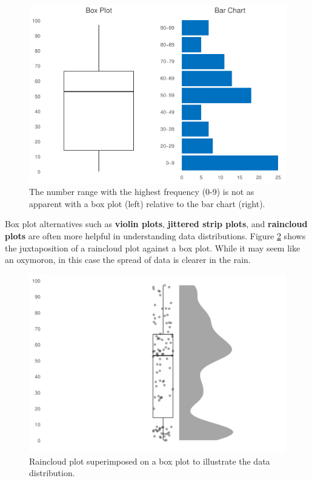 \documentclass[
]{book}
\begin{document}
\begin{figure}

{\centering \includegraphics[width=1\linewidth]{The_Fundamentals_of_People_Analytics_files/figure-latex/boxplot-barchart-compare-1} 

}

\caption{The number range with the highest frequency (0-9) is not as apparent with a box plot (left) relative to the bar chart (right).}\label{fig:boxplot-barchart-compare}
\end{figure}

Box plot alternatives such as \textbf{violin plots}, \textbf{jittered strip plots}, and \textbf{raincloud plots} are often more helpful in understanding data distributions. Figure \ref{fig:boxplot-alt} shows the juxtaposition of a raincloud plot against a box plot. While it may seem like an oxymoron, in this case the spread of data is clearer in the rain.

\begin{figure}

{\centering \includegraphics[width=1\linewidth]{The_Fundamentals_of_People_Analytics_files/figure-latex/boxplot-alt-1} 

}

\caption{Raincloud plot superimposed on a box plot to illustrate the data distribution.}\label{fig:boxplot-alt}
\end{figure}
\end{document}
